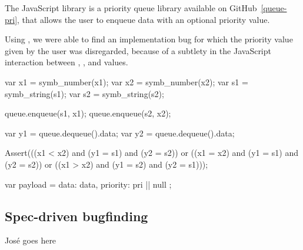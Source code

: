 \FloatBarrier


The JavaScript  library is a priority queue library available on GitHub~\ref{queue-pri}, that allows the user to enqueue data with an optional priority value.

Using \cosette, we were able to find an implementation bug for which the priority value given by the user was disregarded, because of a subtlety in the JavaScript interaction between , , and  values.

\begin{lstjs}
var x1 = symb_number(x1);
var x2 = symb_number(x2);
var s1 = symb_string(s1);
var s2 = symb_string(s2);

queue.enqueue(s1, x1);
queue.enqueue(s2, x2);

var y1 = queue.dequeue().data;
var y2 = queue.dequeue().data;

Assert(((x1 < x2) and (y1 = s1) and (y2 = s2)) 
    or ((x1 = x2) and (y1 = s1) and (y2 = s2))
    or ((x1 > x2) and (y1 = s2) and (y2 = s1)));
\end{lstjs}

\begin{lstjs}
var payload = {
    data: data,
    priority: pri || null
};
\end{lstjs}

\subsection{Spec-driven bugfinding}

José goes here